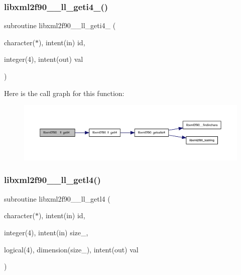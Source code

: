 \subsubsection{\texorpdfstring{libxml2f90\+\_\+\+\_\+ll\+\_\+geti4\+\_\+()}{libxml2f90\_\_ll\_geti4\_()}}
{\footnotesize\ttfamily subroutine libxml2f90\+\_\+\+\_\+ll\+\_\+geti4\+\_\+ (\begin{DoxyParamCaption}\item[{character($\ast$), intent(in)}]{id,  }\item[{integer(4), intent(out)}]{val }\end{DoxyParamCaption})}

Here is the call graph for this function\+:
\nopagebreak
\begin{figure}[H]
\begin{center}
\leavevmode
\includegraphics[width=350pt]{libxml2f90_8f90__pp_8f90_a1c2a48ca65f77d8c56223d71e08ced37_cgraph}
\end{center}
\end{figure}
\mbox{\label{libxml2f90_8f90__pp_8f90_a1b0c5cd537f12f2edf530cddaf84caf5}} 
\subsubsection{\texorpdfstring{libxml2f90\+\_\+\+\_\+ll\+\_\+getl4()}{libxml2f90\_\_ll\_getl4()}}
{\footnotesize\ttfamily subroutine libxml2f90\+\_\+\+\_\+ll\+\_\+getl4 (\begin{DoxyParamCaption}\item[{character($\ast$), intent(in)}]{id,  }\item[{integer(4), intent(in)}]{size\+\_\+,  }\item[{logical(4), dimension(size\+\_\+), intent(out)}]{val }\end{DoxyParamCaption})}

